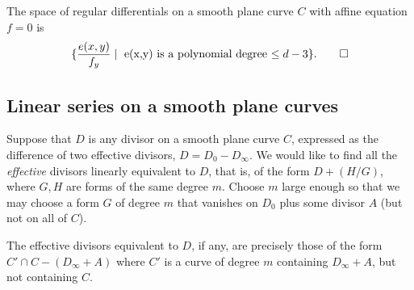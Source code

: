 \begin{theorem}
The space of regular differentials on a smooth plane curve $C$
with affine equation $f=0$ is 
$$
\{ \frac{e(x,y)}{f_{y}} \mid \hbox{ e(x,y) is a polynomial degree $\leq d-3$}\}.\qed
 $$
\end{theorem}
%
%

\subsection{Linear series on a smooth plane curves}\label{linear series on smooth plane curves}

Suppose that $D$ is any divisor on a smooth plane curve $C$, expressed as the difference of
two effective divisors, $D= D_0-D_\infty$. We would like to find all the \emph{effective} divisors linearly equivalent to $D$, that is, of the form
$D + (H/G)$, where $G, H$ are forms of the same degree $m$. Choose $m$ large enough so that
we may choose
 a form $G$ of degree $m$ that vanishes on $D_0$ plus some divisor $A$ (but not on all of $C$). 
 
 
\begin{theorem}\label{equiv on smooth plane curve}
The effective divisors equivalent to $D$, if any, are precisely those of the form $C'\cap C -(D_\infty+A)$ where $C'$
is a curve of degree $m$ containing $D_\infty+A$, but not containing $C$.
\end{theorem}

